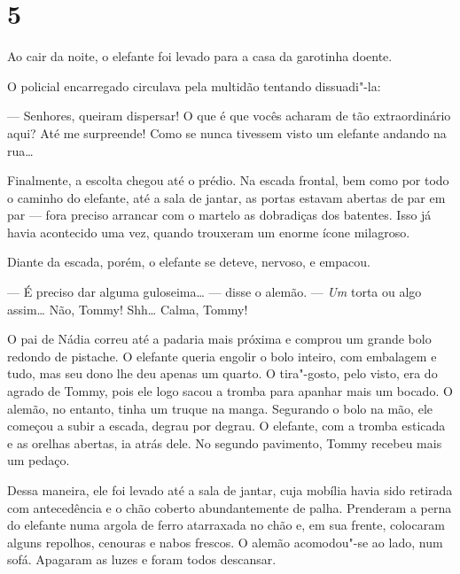 \section{5}

Ao cair da noite, o elefante foi levado para a casa da garotinha doente.


O policial encarregado circulava pela multidão tentando dissuadi"-la:

--- Senhores, queiram dispersar! O que é que vocês acharam de tão
extraordinário aqui? Até me surpreende! Como se nunca tivessem visto um
elefante andando na rua\ldots{}

Finalmente, a escolta chegou até o prédio. Na escada frontal, bem como
por todo o caminho do elefante, até a sala de jantar, as portas estavam
abertas de par em par --- fora preciso arrancar com o martelo as
dobradiças dos batentes. Isso já havia acontecido uma vez, quando
trouxeram um enorme ícone milagroso.

Diante da escada, porém, o elefante se deteve, nervoso, e empacou.

--- É preciso dar alguma guloseima\ldots{} --- disse o alemão. --- \emph{Um}
torta ou algo assim\ldots{} Não, Tommy! Shh\ldots{} Calma, Tommy!

O pai de Nádia correu até a padaria mais próxima e comprou um grande
bolo redondo de pistache. O elefante queria engolir o bolo inteiro, com
embalagem e tudo, mas seu dono lhe deu apenas um quarto. O tira"-gosto,
pelo visto, era do agrado de Tommy, pois ele logo sacou a tromba para
apanhar mais um bocado. O alemão, no entanto, tinha um truque na manga.
Segurando o bolo na mão, ele começou a subir a escada, degrau por
degrau. O elefante, com a tromba esticada e as orelhas abertas, ia atrás
dele. No segundo pavimento, Tommy recebeu mais um pedaço.

Dessa maneira, ele foi levado até a sala de jantar, cuja mobília havia sido retirada com antecedência e o chão coberto abundantemente de palha. Prenderam a perna do elefante numa argola de ferro
atarraxada no chão e, em sua frente, colocaram alguns repolhos, cenouras
e nabos frescos. O alemão acomodou"-se ao lado, num sofá. Apagaram as
luzes e foram todos descansar.

